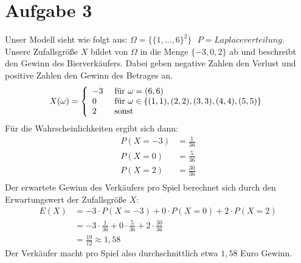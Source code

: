 \documentclass[10pt,a4paper]{article}
\begin{document}
\section*{Aufgabe 3}
Unser Modell sieht wie folgt aus: $\Omega = \{\{1,...,6\}^2\} \text{ } P =Laplaceverteilung$. Unsere Zufallsgröße $X$ bildet von $\Omega$ in die Menge $\{-3,0,2\}$ ab und beschreibt den Gewinn des Bierverkäufers. Dabei geben negative Zahlen den Verlust und positive Zahlen den Gewinn des Betrages an.
\begin{align*}
X(\omega) = \left\{
\begin{array}{l l}
-3 &\text{ für } \omega = (6,6)  \\ 
0 &\text{ für }  \omega \in \{(1,1),(2,2),(3,3),(4,4),(5,5)\}\\
2 &\text{ sonst}
\end{array}
\right.
\end{align*}
Für die Wahrscheinlichkeiten ergibt sich dann:
\begin{align*}
P(X=-3)&=\frac{1}{36}\\
P(X=0)&=\frac{5}{36}\\
P(X=2)&=\frac{30}{36}\\
\end{align*}
Der erwartete Gewinn des Verkäufers pro Spiel berechnet sich durch den Erwartungswert der Zufallsgröße $X$:
\begin{align*}
E(X) &= -3 \cdot P(X=-3) + 0 \cdot P(X=0) + 2 \cdot P(X=2)\\
&= -3 \cdot \frac{1}{36} + 0 \cdot \frac{5}{36} + 2 \cdot \frac{30}{36}\\
&= \frac{19}{12} \approx 1,58
\end{align*}
Der Verkäufer macht pro Spiel also durchschnittlich etwa $1,58$ Euro Gewinn.
\end{document}
